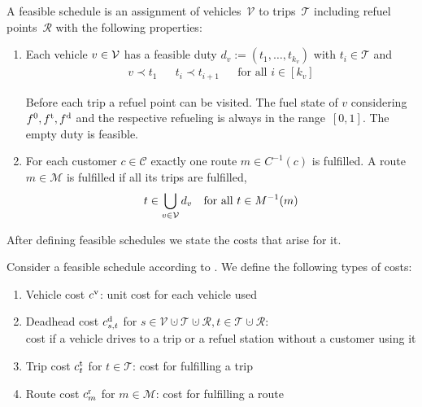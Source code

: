 \begin{definition}
\label{def:feasible_schedule}

A feasible schedule is an assignment of vehicles~$\mathcal{V}$ to trips~$\mathcal{T}$ including refuel points~$\mathcal{R}$ with the following properties:

\begin{enumerate}
	\item
Each vehicle $v\in\mathcal{V}$ has a feasible duty ${d_v := \left(t_1,\dots,t_{k_v}\right)}$ with ${t_i\in\mathcal{T}}$ and
\begin{align*}
	v\prec t_1 && t_i\prec t_{i+1} && \text{for all } i\in[k_v]
\end{align*}

Before each trip a refuel point can be visited. The fuel state of $v$ considering $f^0, f^{\operatorname{t}}, f^{\operatorname{d}}$ and the respective refueling is always in the range~$[0,1]$. The empty duty is feasible.

	\item
For each customer $c\in\mathcal{C}$ exactly one route ${m\in C^{-1}(c)}$ is fulfilled. A route ${m\in\mathcal{M}}$ is fulfilled if all its trips are fulfilled, \ie
\begin{align*}
	t\in\bigcup_{v\in\mathcal{V}} d_v && \text{for all } t\in M^{-1}(m)
\end{align*}
\end{enumerate}

\end{definition}

After defining feasible schedules we state the costs that arise for it.

\begin{definition}
\label{def:costs}

Consider a feasible schedule according to . We define the following types of costs:

\begin{enumerate}
	\item{Vehicle cost $c^{\operatorname{v}}$: unit cost for each vehicle used}
	\item{Deadhead cost $c^{\operatorname{d}}_{s,t}$ for $s\in\mathcal{V}\cupdot\mathcal{T}\cupdot\mathcal{R}, t\in\mathcal{T}\cupdot\mathcal{R}$:\\
	cost if a vehicle drives to a trip or a refuel station without a customer using it}
	\item{Trip cost $c^{\operatorname{t}}_t$ for $t\in\mathcal{T}$: cost for fulfilling a trip}
	\item{Route cost $c^{\operatorname{r}}_m$ for $m\in\mathcal{M}$: cost for fulfilling a route}
\end{enumerate}

\end{definition}

